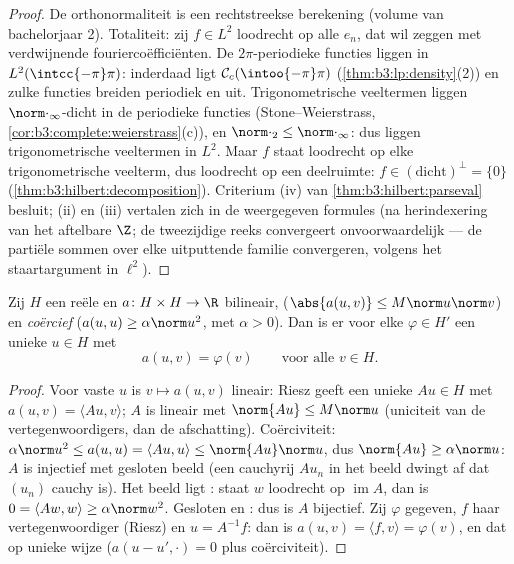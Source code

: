\begin{proof}
De orthonormaliteit is een rechtstreekse berekening (volume van
bachelorjaar 2). Totaliteit: zij $f \in L^2$ loodrecht op alle
$e_n$, dat wil zeggen met verdwijnende fouriercoëfficiënten. De
 $2\pi$-periodieke functies liggen  in
$L^2(\intcc{-\pi}\pi)$: inderdaad ligt $\mathcal
C_c(\intoo{-\pi}\pi)$  (\cref{thm:b3:lp:density}(2)) en
zulke functies breiden periodiek en  uit.
Trigonometrische veeltermen liggen
$\norm\cdot_\infty$-dicht in de  periodieke functies
(Stone--Weierstrass, \cref{cor:b3:complete:weierstrass}(c)), en
$\norm\cdot_2 \leq \norm\cdot_\infty$: dus liggen
trigonometrische veeltermen  in $L^2$. Maar $f$ staat
loodrecht op elke trigonometrische veelterm, dus loodrecht op een
 deelruimte: $f \in (\text{dicht})^\perp = \{0\}$
(\cref{thm:b3:hilbert:decomposition}). Criterium (iv) van
\cref{thm:b3:hilbert:parseval} besluit; (ii) en (iii) vertalen
zich in de weergegeven formules (na herindexering van het
aftelbare $\Z$; de tweezijdige reeks convergeert
onvoorwaardelijk --- de partiële sommen over elke uitputtende
familie convergeren, volgens het staartargument in $\ell^2$).
\end{proof}

\begin{theorem}\label{thm:b3:hilbert:laxmilgram}
Zij $H$ een reële  en $a \colon H\times H \to \R$
bilineair, \emph{} ($\abs{a(u,v)} \leq M\norm u\norm v$)
en \emph{coërcief} ($a(u, u) \geq \alpha\norm u^2$, met $\alpha >
0$). Dan is er voor elke $\varphi \in H'$ een unieke $u \in H$
met
\[
a(u, v) = \varphi(v) \qquad \text{voor alle } v \in H .
\]
\end{theorem}

\begin{proof}
Voor vaste $u$ is $v \mapsto a(u, v)$  lineair: Riesz
geeft een unieke $Au \in H$ met $a(u,v) = \langle Au, v\rangle$;
$A$ is lineair met $\norm{Au} \leq M\norm u$ (uniciteit van de
vertegenwoordigers, dan de afschatting). Coërciviteit:
$\alpha\norm u^2 \leq a(u,u) = \langle Au, u\rangle \leq
\norm{Au}\norm u$, dus $\norm{Au} \geq \alpha\norm u$: $A$ is
injectief met gesloten beeld (een cauchyrij $Au_n$ in het beeld
dwingt af dat $(u_n)$ cauchy is). Het beeld ligt : staat $w$
loodrecht op $\operatorname{im}A$, dan is $0 = \langle Aw,
w\rangle \geq \alpha\norm w^2$. Gesloten en : dus is $A$
bijectief. Zij $\varphi$ gegeven, $f$ haar vertegenwoordiger
(Riesz) en $u = A^{-1}f$: dan is $a(u, v) = \langle f, v\rangle =
\varphi(v)$, en dat op unieke wijze ($a(u - u', \cdot) = 0$ plus
coërciviteit).
\end{proof}

